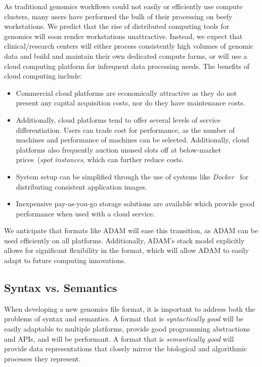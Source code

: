 \documentclass{bioinfo}
\begin{document}
As traditional genomics workflows could not easily or efficiently use compute clusters, many users have performed the bulk of their processing on beefy workstations. We predict
that the rise of distributed computing tools for genomics will soon render workstations unattractive. Instead, we expect that clinical/research centers will either process
consistently high volumes of genomic data and build and maintain their own dedicated compute farms, or will use a cloud computing platform for infrequent data processing
needs. The benefits of cloud computing include:

\begin{itemize}
\item Commercial cloud platforms are economically attractive as they do not present any capital acquisition costs, nor do they have maintenance costs.
\item Additionally, cloud platforms tend to offer several levels of service differentiation. Users can trade cost for performance, as the number of machines and performance of
machines can be selected. Additionally, cloud platforms also frequently auction unused slots off at below-market prices~(\emph{spot instances}, which can further reduce costs.
\item System setup can be simplified through the use of systems like \textit{Docker}~\citep{docker} for distributing consistent application images.
\item Inexpensive pay-as-you-go storage solutions are available which provide good performance when used with a cloud service.
\end{itemize}

We anticipate that formats like ADAM will ease this transition, as ADAM can be used efficiently on all platforms. Additionally, ADAM's stack model explicitly allows for significant
flexibility in the format, which will allow ADAM to easily adapt to future computing innovations.

\subsection{Syntax vs. Semantics}
\label{sec:syntax-vs-semantics}

When developing a new genomics file format, it is important to address both the problems of syntax and semantics. A format that is \emph{syntactically good} will be easily
adaptable to multiple platforms, provide good programming abstractions and APIs, and will be performant. A format that is \emph{semantically good} will provide data
representations that closely mirror the biological and algorithmic processes they represent.
\end{document}
